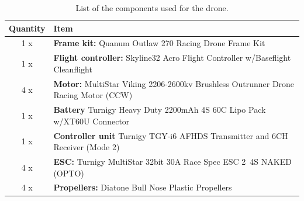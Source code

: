 \begin{table}[H]
\caption{List of the components used for the drone.}\label{tab:drone_element}
\begin{tabular}{|c|p{12cm}|}
\hline
\textbf{Quantity} & \textbf{Item} \\ \hline
1 x  & \textbf{Frame kit:} Quanum Outlaw 270 Racing Drone Frame Kit \\ \hline
1 x & \textbf{Flight controller:} Skyline32 Acro Flight Controller w/Baseflight  Cleanflight \\ \hline
4 x & \textbf{Motor:} MultiStar Viking 2206-2600kv Brushless Outrunner Drone Racing Motor (CCW) \\ \hline
1 x & \textbf{Battery} Turnigy Heavy Duty 2200mAh 4S 60C Lipo Pack w/XT60U Connector \\ \hline
1 x & \textbf{Controller unit} Turnigy TGY-i6 AFHDS Transmitter and 6CH Receiver (Mode 2) \\ \hline
4 x & \textbf{ESC:} Turnigy MultiStar 32bit 30A Race Spec ESC 2~4S NAKED (OPTO) \\ \hline
4 x & \textbf{Propellers:} Diatone Bull Nose Plastic Propellers \\ \hline
\end{tabular} 
\end{table}